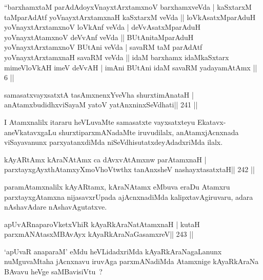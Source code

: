 
\begin{shl}
``barxhamxtaM parAdAdoyxVnayxtArxtamxnoV barxhamxveVda |
kaSxtarxM taMparAdAtf yoV\s nayxtArxtamxnaH kaSxtarxM veVda ||
loVkAsatxMparAduH yoV\s nayxtArxtamxnoV loVkAnf veVda |
deVvAsatxMparAduH yoV\s nayxtAtamxnoV deVvAnf veVda ||
BUtAnitaMparAduH yoV\s nayxtArxtamxnoV BUtAni veVda |
savaRM taM parAdAtf yoV\s nayxtArxtamxnaH savaRM veVda ||
idaM barxhamx idaMkaSxtarx mimeVloVkAH imeV deVvAH |
imAni BUtAni idaM savaRM yadayamAtAmx || 6 ||
\end{shl}


\begin{shl}
samasatxvayxsatxtA tasAmxnenxYveVha shurxtimAnataH |
anAtamxbudidhxviSayaM yatoV yatAnxninxSeVdhati\hfill || 241 ||
\end{shl}

\begin{artha}
I Atamxnalilx itararu heVLuvaMte samasatxte vayxsatxteyu Ekatavx-aneVkatavxgaLu shurxtiparxmANadaMte iruvudilalx, anAtamxjAcnxnada viSayavanunx parxyatanxdiMda niSeVdhisutatxdeyAdadxriMda ilalx.
\end{artha}

\begin{shl}
kAyARtAmx kAraNAtAmx ca dAvxvAtAmxnw parAtamxnaH |
parxtayxgAyxthAtamxyXmoVhoVtwthx tanAnxsheV nashayxtasatxtaH\hfill || 242 ||
\end{shl}

\begin{artha}
paramAtamxnalilx kAyARtamx, kAraNAtamx eMbuva eraDu Atamxru parxtayxgAtamxna nijasavxrUpada ajAcnxnadiMda kalipxtavAgiruvaru, adara nAshavAdare nAshavAgutatxve.
\end{artha}

\begin{shl}
apUvARnaparoVketxVhiR kAyaRkAraNatA\s\s tamxnaH |
kutaH parxmANAtasxMBAvAyx kAyaRkAraNaGasamxreV\hfill || 243 ||
\end{shl}

\begin{artha}
`apUvaR anaparaM' eMdu heVLidadxriMda kAyaRkAraNagaLanunx nuMguvaMtaha jAcnxnavu iruvAga parxmANadiMda Atamxnige kAyaRkAraNa BAvavu heVge saMBavisiVtu~?
\end{artha}


